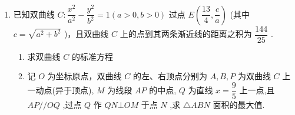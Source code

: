 \begin{enumerate}
\begin{enumerate}
\begin{jieda}
\begin{enumerate}
                设 $M\left( {{x}_{1},{y}_{1}}\right), N\left( {{x}_{2},{y}_{2}}\right)$，线段 ${MN}$ 的中点 $Q\left( {{x}_{0},{y}_{0}}\right)$，由韦达定理可得 $\left\{\begin{array}{l}
                     {x}_{1} + {x}_{2} = \dfrac{2km}{3 - {k}^{2}}  \\
                     {x}_{1} \cdot  {x}_{2} =  - \dfrac{{m}^{2} + 3}{3 - {k}^{2}} 
                \end{array}\right.$，则 ${x}_{0} = \dfrac{{x}_{1} + {x}_{2}}{2} = \dfrac{km}{3 - {k}^{2}}$，${y}_{0} = k{x}_{0} + m = \dfrac{3m}{3 - {k}^{2}}$，即$Q\left(\dfrac{km}{3 - {k}^{2}}, \dfrac{3m}{3 - {k}^{2}}\right)$
                
                因为$\left| {BM}\right|  = \left| {BN}\right| $，所以${BQ} \bot  {MN}$，即${k}_{BQ} = \dfrac{{y}_{0} - \sqrt{3}}{{x}_{0}} = \dfrac{\dfrac{3m}{3 - {k}^{2}} - \sqrt{3}}{\dfrac{km}{3 - {k}^{2}}} =  - \dfrac{1}{k}$，整理得$3 - {k}^{2} = \dfrac{4\sqrt{3}}{3}m$，故${k}^{2} = 3 - \dfrac{4\sqrt{3}}{3}m > 0$，即$m < \dfrac{3\sqrt{3}}{4}$

                代入判别式约束$3 + {m}^{2} - {k}^{2} > 0$，消去$k$可得$m^2 + \dfrac{4\sqrt{3}}{3}m > 0$
                
                综上，$m <  - \dfrac{4\sqrt{3}}{3}$ 或 $0 < m < \dfrac{3\sqrt{3}}{4}$ .
            \end{enumerate}
        \end{jieda}

        \item 已知双曲线 $C : \dfrac{{x}^{2}}{{a}^{2}} - \dfrac{{y}^{2}}{{b}^{2}} = 1\left( {a > 0,b > 0}\right)$ 过点 $E\left( {\dfrac{13}{4},\dfrac{c}{a}}\right)$ (其中 $c = \sqrt{{a}^{2} + {b}^{2}}$ )，且双曲线 $C$ 上的点到其两条渐近线的距离之积为 $\dfrac{144}{25}$ .
        \begin{enumerate}
            \item 求双曲线 $C$ 的标准方程
            \item 记 $O$ 为坐标原点，双曲线 $C$ 的左、右顶点分别为 $A,B,P$ 为双曲线 $C$ 上一动点(异于顶点), $M$ 为线段 ${AP}$ 的中点, $Q$ 为直线 $x = \dfrac{9}{5}$ 上一点,且 ${AP}//{OQ}$ ,过点 $Q$ 作 ${QN} \bot  {OM}$ 于点 $N$ ,求 $\bigtriangleup {ABN}$ 面积的最大值.
        \end{enumerate}


\end{enumerate}
\end{enumerate}
